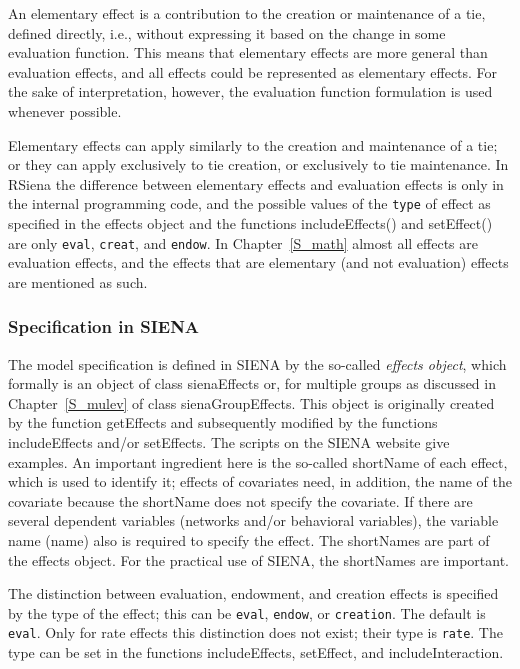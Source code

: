 \documentclass[a4paper,fleqn,11pt]{article}
\newcommand{\+}{\, + \,}
\newcommand{\sfn}[1]{\textsf{#1}}
\newcommand{\RS}{{\sf RSiena }}
\newcommand{\SI}{{\sf SIENA }}
\newcommand{\si}{{\sf SIENA}}
\begin{document}
An elementary effect is a contribution to the creation or maintenance of a tie,
defined directly, i.e., without expressing it based on the
change in some evaluation function.
This means that elementary effects are more general than
evaluation effects, and all effects could be represented as elementary effects.
For the sake of interpretation, however, the evaluation function formulation
is used whenever possible.

Elementary effects can apply similarly to the creation and maintenance of a tie;
or they can apply exclusively to tie creation, or exclusively to tie
maintenance. In \RS the difference between elementary effects and evaluation effects
is only in the internal programming code, and the
possible values of the \texttt{type} of effect
as specified in the effects object and the
functions \sfn{includeEffects()} and \sfn{setEffect()}
are only \texttt{eval}, \texttt{creat}, and \texttt{endow}.
In Chapter~\ref{S_math} almost all effects are evaluation effects,
and the effects that are elementary (and not evaluation) effects
are mentioned as such.

\subsubsection{Specification in \SI}

The model specification is defined in \SI by the so-called
\emph{effects object}, which formally is an object of class
\sfn{sienaEffects} or, for multiple groups as discussed in Chapter~\ref{S_mulev}
of class \sfn{sienaGroupEffects}.
This object is originally created by the function \sfn{getEffects} and
subsequently modified by the functions \sfn{includeEffects} and/or
\sfn{setEffects}.
The scripts on the \SI website give examples.
An important ingredient here is the so-called \sfn{shortName}
of each effect, which is used to identify it;
effects of covariates need, in addition, the name of the covariate
because the \sfn{shortName} does not specify the covariate.
If there are several dependent variables (networks and/or behavioral variables),
the variable name (\sfn{name}) also is required to specify the effect.
The \sfn{shortName}s are part of the effects object.
For the practical use of \si, the \sfn{shortName}s are important.

The distinction between evaluation, endowment, and creation effects is
specified by the \sfn{type} of the effect; this can be
\texttt{eval}, \texttt{endow}, or \texttt{creation}.
The default is \texttt{eval}.
Only for rate effects this distinction does not exist;
their \sfn{type} is \texttt{rate}.
The \sfn{type} can be set in the functions \sfn{includeEffects},
\sfn{setEffect}, and \sfn{includeInteraction}.
\end{document}
